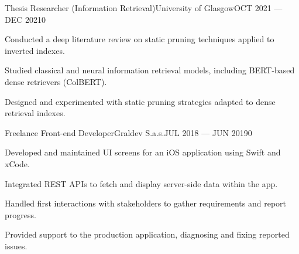 \begin{cventry}{Thesis Researcher (Information Retrieval)}{University of Glasgow}{OCT 2021 — DEC 2021}{0}
\begin{tasks}
  \item Conducted a deep literature review on static pruning techniques applied to inverted indexes.
  \item Studied classical and neural information retrieval models, including BERT-based dense retrievers (ColBERT).
  \item Designed and experimented with static pruning strategies adapted to dense retrieval indexes.
\end{tasks}
\end{cventry}

\begin{cventry}{Freelance Front-end Developer}{Graldev S.a.s.}{JUL 2018 — JUN 2019}{0}
\begin{tasks}
  \item Developed and maintained UI screens for an iOS application using Swift and xCode.
  \item Integrated REST APIs to fetch and display server-side data within the app.
  \item Handled first interactions with stakeholders to gather requirements and report progress.
  \item Provided support to the production application, diagnosing and fixing reported issues.
\end{tasks}
\end{cventry}
